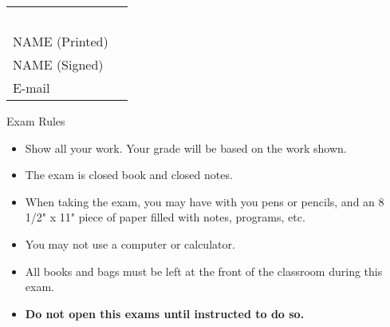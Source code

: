 {\large
\begin{center}
\begin{tabular}{ll}
\mbox{ }
\vspace{.1in} \\
NAME (Printed) & \ul{\hspace{3in}}\\ 
NAME (Signed) & \ul{\hspace{3in}} \\
E-mail & \ul{\hspace{3in}}\\
\end{tabular}
\end{center}


{\small
{\bf
\begin{center}
Exam Rules
\end{center}
\begin{itemize}
	\item Show all your work.  Your grade will be based on the work shown.          \item The exam is closed book and closed notes. 
        \item When taking the exam, you may have with you pens or pencils,
		and an 8 1/2" x 11" 
		piece of paper filled with notes, programs, etc. 
	\item You may not use a computer or calculator. 
	\item All books and bags must be left at the front of the classroom 
		during this exam. 
	\item {\bf Do not open this exams until instructed to do so. }
\end{itemize}
}

}}
